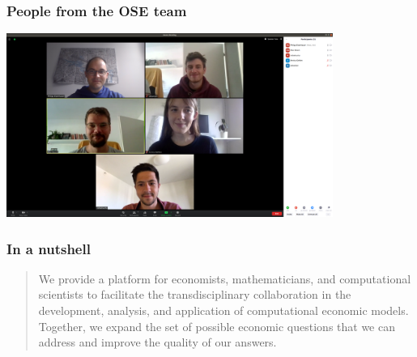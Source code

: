 
\begin{frame}\frametitle{People from the OSE team}

\centering
\includegraphics[width=0.80\textwidth]{material/crop-zoom-meeting.png}\\

\end{frame}

\begin{frame}\frametitle{In a nutshell}
\hspace{1.5cm}
\vspace{0.25cm}

\begin{quote}
	\large
	\raggedright
	\linespread{1.3}\selectfont{}
	We provide a platform for economists, mathematicians, and computational scientists to facilitate the \alert{transdisciplinary collaboration} in the development, analysis, and application of \alert{computational economic models}. 
	\medskip \\
	Together, we expand the set of possible economic questions that we can address and improve the quality of our answers.
\end{quote}

\end{frame}

